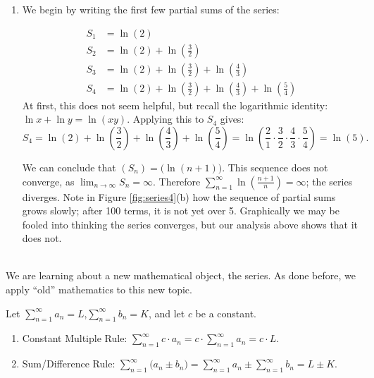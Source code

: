 \documentclass{ximera}
\begin{document}
{\begin{enumerate}
\item		We begin by writing the first few partial sums of the series:

\begin{align*}
S_1 &= \ln\left(2\right) \\
S_2 &= \ln\left(2\right)+\ln\left(\frac32\right) \\
S_3 &= \ln\left(2\right)+\ln\left(\frac32\right)+\ln\left(\frac43\right) \\
S_4 &= \ln\left(2\right)+\ln\left(\frac32\right)+\ln\left(\frac43\right)+\ln\left(\frac54\right) 
\end{align*}
At first, this does not seem helpful, but recall the logarithmic identity: $\ln x+\ln y = \ln (xy).$ Applying this to $S_4$ gives:
$$S_4 = \ln\left(2\right)+\ln\left(\frac32\right)+\ln\left(\frac43\right)+\ln\left(\frac54\right) = \ln\left(\frac21\cdot\frac32\cdot\frac43\cdot\frac54\right) = \ln\left(5\right).$$

We can conclude that $(S_n) = \big(\ln (n+1)\big)$. This sequence  does not converge, as $\lim_{n\to\infty}S_n=\infty$. Therefore  $\sum_{n=1}^\infty  \ln\left(\frac{n+1}{n}\right)=\infty$; the series diverges. Note in Figure \ref{fig:series4}(b) how the sequence of partial sums grows slowly; after 100 terms, it is not yet over 5. Graphically we may be fooled into thinking the series converges, but our analysis above shows that it does not.
\end{enumerate}
\baselineskip
}\\

We are learning about a new mathematical object, the series. As done before, we apply ``old'' mathematics to this new topic.

{Let \quad$\sum_{n=1}^\infty a_n = L$,\quad  $\sum_{n=1}^\infty b_n = K$, and let $c$ be a constant.
\begin{enumerate}
\item  Constant Multiple Rule: $\sum_{n=1}^\infty c\cdot a_n = c\cdot\sum_{n=1}^\infty a_n = c\cdot L.$
\item		Sum/Difference Rule: $\sum_{n=1}^\infty \big(a_n\pm b_n\big) = \sum_{n=1}^\infty a_n \pm \sum_{n=1}^\infty b_n = L \pm K.$
\end{enumerate} 
}
\end{document}
